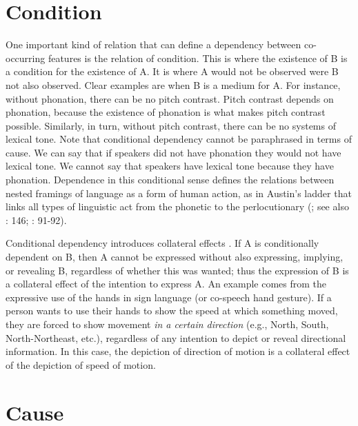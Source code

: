 \documentclass[output=paper]{langsci/langscibook}
\begin{document}
\section{Condition}

One important kind of relation that can define a dependency between co-occurring features is the relation of condition. This is where the existence of B is a condition for the existence of A. It is where A would not be observed were B not also observed. Clear examples are when B is a medium for A. For instance, without phonation, there can be no pitch contrast. Pitch contrast depends on phonation, because the existence of phonation is what makes pitch contrast possible. Similarly, in turn, without pitch contrast, there can be no systems of lexical tone. Note that conditional dependency cannot be paraphrased in terms of cause.    We can say that if  speakers did not have phonation they would not have lexical tone. We cannot say that  speakers have lexical tone because they have phonation. Dependence in this conditional sense defines the relations between nested framings of language as a form of human action, as in Austin’s ladder  that links all types of linguistic act from the phonetic to the perlocutionary (\citealt{Austin1962}; see also \citeauthor{Clark1996} \citeyear{Clark1996}: 146; \citeauthor{Enfield2013agencyenchrony} \citeyear{Enfield2013agencyenchrony}: 91-92).

Conditional dependency introduces collateral effects \citep{Sidnell2012collateral}. If A is conditionally dependent on B, then A cannot be expressed without also expressing, implying, or revealing B, regardless of whether this was wanted; thus the expression of B is a collateral effect of the intention to express A. An example comes from the expressive use of the hands  in sign language (or co-speech hand gesture). If a person wants to use their hands to show the speed at which something moved, they are forced to show movement \textit{in a certain direction} (e.g., North, South, North-Northeast, etc.), regardless of any intention to depict  or reveal directional information. In this case, the depiction of direction of motion is a collateral effect of the depiction of speed of motion. 

\section{Cause}
\end{document}
